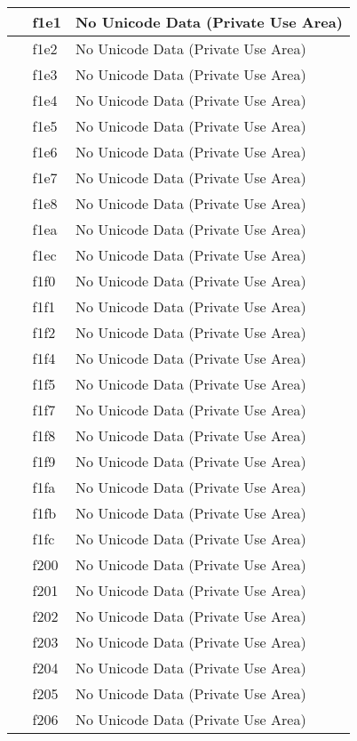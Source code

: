 \documentclass[12pt,letterpaper,openany]{book}
\begin{document}
\begin{center}
\begin{supertabular}{|m{0.25in}|m{0.5in}|m{4in}|}
 & f1e1 & No Unicode Data (Private Use Area)\\\hline
 & f1e2 & No Unicode Data (Private Use Area)\\\hline
 & f1e3 & No Unicode Data (Private Use Area)\\\hline
 & f1e4 & No Unicode Data (Private Use Area)\\\hline
 & f1e5 & No Unicode Data (Private Use Area)\\\hline
 & f1e6 & No Unicode Data (Private Use Area)\\\hline
 & f1e7 & No Unicode Data (Private Use Area)\\\hline
 & f1e8 & No Unicode Data (Private Use Area)\\\hline
 & f1ea & No Unicode Data (Private Use Area)\\\hline
 & f1ec & No Unicode Data (Private Use Area)\\\hline
 & f1f0 & No Unicode Data (Private Use Area)\\\hline
 & f1f1 & No Unicode Data (Private Use Area)\\\hline
 & f1f2 & No Unicode Data (Private Use Area)\\\hline
 & f1f4 & No Unicode Data (Private Use Area)\\\hline
 & f1f5 & No Unicode Data (Private Use Area)\\\hline
 & f1f7 & No Unicode Data (Private Use Area)\\\hline
 & f1f8 & No Unicode Data (Private Use Area)\\\hline
 & f1f9 & No Unicode Data (Private Use Area)\\\hline
 & f1fa & No Unicode Data (Private Use Area)\\\hline
 & f1fb & No Unicode Data (Private Use Area)\\\hline
 & f1fc & No Unicode Data (Private Use Area)\\\hline
 & f200 & No Unicode Data (Private Use Area)\\\hline
 & f201 & No Unicode Data (Private Use Area)\\\hline
 & f202 & No Unicode Data (Private Use Area)\\\hline
 & f203 & No Unicode Data (Private Use Area)\\\hline
 & f204 & No Unicode Data (Private Use Area)\\\hline
 & f205 & No Unicode Data (Private Use Area)\\\hline
 & f206 & No Unicode Data (Private Use Area)\\\hline

\end{supertabular}
\end{center}
\end{document}
